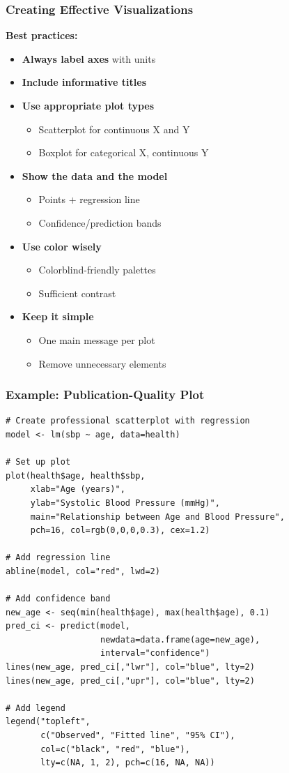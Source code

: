 \documentclass{beamer}
\begin{document}
\begin{frame}
\frametitle{Creating Effective Visualizations}
\textbf{Best practices:}

\vspace{0.3cm}
\begin{itemize}
\item \textbf{Always label axes} with units
\item \textbf{Include informative titles}
\item \textbf{Use appropriate plot types}
  \begin{itemize}
  \item Scatterplot for continuous X and Y
  \item Boxplot for categorical X, continuous Y
  \end{itemize}
\item \textbf{Show the data and the model}
  \begin{itemize}
  \item Points + regression line
  \item Confidence/prediction bands
  \end{itemize}
\item \textbf{Use color wisely}
  \begin{itemize}
  \item Colorblind-friendly palettes
  \item Sufficient contrast
  \end{itemize}
\item \textbf{Keep it simple}
  \begin{itemize}
  \item One main message per plot
  \item Remove unnecessary elements
  \end{itemize}
\end{itemize}
\end{frame}

\begin{frame}[fragile]
\frametitle{Example: Publication-Quality Plot}
\small
\begin{verbatim}
# Create professional scatterplot with regression
model <- lm(sbp ~ age, data=health)

# Set up plot
plot(health$age, health$sbp,
     xlab="Age (years)",
     ylab="Systolic Blood Pressure (mmHg)",
     main="Relationship between Age and Blood Pressure",
     pch=16, col=rgb(0,0,0,0.3), cex=1.2)

# Add regression line
abline(model, col="red", lwd=2)

# Add confidence band
new_age <- seq(min(health$age), max(health$age), 0.1)
pred_ci <- predict(model,
                   newdata=data.frame(age=new_age),
                   interval="confidence")
lines(new_age, pred_ci[,"lwr"], col="blue", lty=2)
lines(new_age, pred_ci[,"upr"], col="blue", lty=2)

# Add legend
legend("topleft",
       c("Observed", "Fitted line", "95% CI"),
       col=c("black", "red", "blue"),
       lty=c(NA, 1, 2), pch=c(16, NA, NA))
\end{verbatim}
\end{frame}
\end{document}
